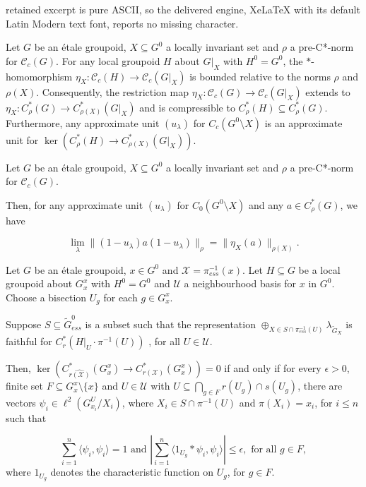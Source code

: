 \documentclass[10pt,a4paper]{amsart}
\begin{document}
retained excerpt is pure ASCII, so the delivered engine, XeLaTeX with its default Latin Modern text font, reports no missing character.
\begin{thm}
    \label{thm:locinvar&compress}
     Let $G$ be an \'etale groupoid, $X\subseteq G^{0}$ a locally invariant set and $\rho$ a pre-C*-norm for $\mathscr{C}_{c}(G)$. For any local groupoid $H$ about $G|_{X}$ with $H^{0} = G^{0}$, the $*$-homomorphism $\eta_{X}:\mathscr{C}_{c}(H)\to \mathscr{C}_{c}(G|_{X})$ is bounded relative to the norms $\rho$ and $\rho(X)$. Consequently, the restriction map $\eta_{X}:\mathscr{C}_{c}(G)\to \mathscr{C}_{c}(G|_{X})$ extends to $\eta_{X}:C^{*}_{\rho}(G)\to C^{*}_{\rho(X)}(G|_{X})$ and is compressible to $C^{*}_{\rho}(H)\subseteq C^{*}_{\rho}(G)$. Furthermore, any approximate unit $(u_{\lambda})$ for $C_{c}(G^{0}\setminus X)$ is an approximate unit for $\ker(C^{*}_{\rho}(H)\to C^{*}_{\rho(X)}(G|_{X}))$.
\end{thm}

\begin{cor}
\label{cor:normeqngpd}
       Let $G$ be an \'etale groupoid, $X\subseteq G^{0}$ a locally invariant set and $\rho$ a pre-C*-norm for $\mathscr{C}_{c}(G)$.
       
       Then, for any approximate unit $(u_{\lambda})$ for $C_{0}(G^{0}\setminus X)$ and any $a\in C^{*}_{\rho}(G)$, we have 
       
       \begin{equation}
       \label{eq:norm3}
           \lim_{\lambda}\|(1-u_{\lambda})a(1-u_{\lambda})\|_{\rho} = \|\eta_{X}(a)\|_{\rho(X)}.
       \end{equation}
\end{cor}

\begin{lem}
\label{lem:groupidealcharlocwkcont}
    Let $G$ be an \'etale groupoid, $x\in G^{0}$ and $\mathcal{X} = \pi^{-1}_{ess}(x)$. Let $H\subseteq G$ be a local groupoid about $G^{x}_{x}$ with $H^{0} = G^{0}$ and $\mathcal{U}$ a neighbourhood basis for $x$ in $G^{0}$. Choose a bisection $U_{g}$ for each $g\in G^{x}_{x}$.
    
    Suppose $S\subseteq \tilde{G}_{ess}^{0}$ is a subset such that the representation $\oplus_{X\in S\cap\pi_{ess}^{-1}(U)}\lambda_{\tilde{G}_{X}}$ is faithful for $C^{*}_{r}(H|_{U}\cdot \pi^{-1}(U))$ , for all $U\in\mathcal{U}$.

    Then, $\ker(C^{*}_{\widehat{r(\mathcal{X})}}(G^{x}_{x})\to C^{*}_{r(\mathcal{X})}(G^{x}_{x})) = 0$ if and only if for every $\epsilon > 0$, finite set $F\subseteq G^{x}_{x}\setminus \{x\}$ and $U\in\mathcal{U}$ with  $U\subseteq \bigcap_{g\in F} r(U_{g})\cap s(U_{g})$, there are vectors $\psi_{i}\in \ell^{2}(G_{x_{i}}^{U}/X_{i})$, where $X_{i}\in S\cap \pi^{-1}(U)$ and $\pi(X_{i}) = x_{i}$, for $i\leq n$ such that

    $$\sum^{n}_{i=1}\langle \psi_{i}, \psi_{i}\rangle = 1\text{ and }|\sum^{n}_{i=1}\langle 1_{U_{g}} * \psi_{i}, \psi_{i}\rangle |\leq \epsilon, \text{ for all }g\in F,$$
    where $1_{U_{g}}$ denotes the characteristic function on $U_{g}$, for $g\in F$. 
\end{lem}
\end{document}
